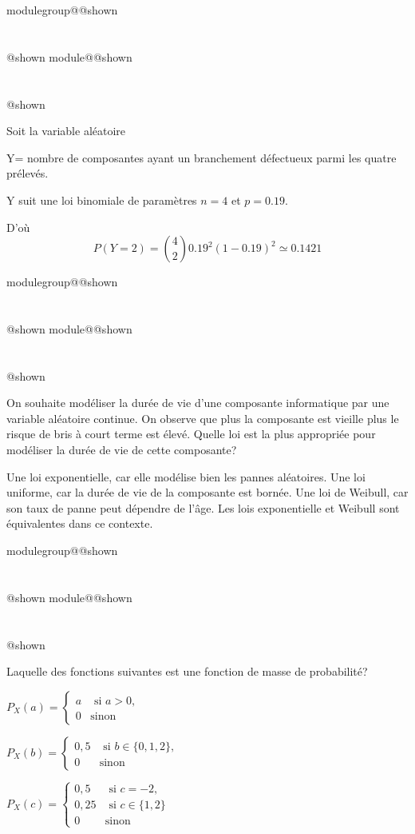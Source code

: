 \documentclass{Evaluation}
\makeatletter
\newcommand{\currentmodulekey}{}
\newcommand{\currentmoduletitle}{}
\newcommand{\currentgroupkey}{}
\newcommand{\currentgrouptitle}{}
\newcommand{\showmoduleifneeded}{%
  \ifx\currentgroupkey\empty\else
    \expandafter\ifx\csname modulegroup@\currentgroupkey @shown\endcsname\relax
      \section*{\currentgrouptitle}%
      \expandafter\gdef\csname modulegroup@\currentgroupkey @shown\endcsname{1}%
    \fi
  \fi
  \expandafter\ifx\csname module@\currentmodulekey @shown\endcsname\relax
    \section*{\currentmoduletitle}%
    \expandafter\gdef\csname module@\currentmodulekey @shown\endcsname{1}%
  \fi
}
\newenvironment{A22}{\showmoduleifneeded}{}
\newenvironment{A24}{\showmoduleifneeded}{}
\newenvironment{H26}{\showmoduleifneeded}{}
\makeatother
\begin{document}
\begin{questions}
\begin{A24}
\begin{center}
\begin{parts}
 \begin{solution}
     Soit la variable aléatoire 

     Y= nombre de composantes ayant un branchement défectueux parmi les quatre prélevés.

     Y suit une loi binomiale de paramètres $n=4$ et $p=0.19$.

     D'où
     $$P(Y=2) = \binom{4}{2}0.19^2(1-0.19)^2 \simeq 0.1421$$
 \end{solution}
\end{parts}
\end{center}
\end{A24}

\begin{H26}
\question {} %
On souhaite modéliser la durée de vie d’une composante informatique par une variable aléatoire continue. On observe que plus la composante est vieille plus le risque de bris à court terme est élevé. Quelle loi est la plus appropriée pour modéliser la durée de vie de cette composante?

\begin{checkboxes}
\choice Une loi exponentielle, car elle modélise bien les pannes aléatoires.
\choice Une loi uniforme, car la durée de vie de la composante est bornée.
\correctchoice Une loi de Weibull, car son taux de panne peut dépendre de l’âge.
\choice Les lois exponentielle et Weibull sont équivalentes dans ce contexte.
\end{checkboxes}
\end{H26}

\begin{A22}
\question {} %
Laquelle des fonctions suivantes est une fonction de masse de probabilité? 

\begin{checkboxes}
\choice $P_X(a)=\left\{
\begin{array}{ll}
a  & \mbox{ si } a>0, \\
0 & \mbox{sinon}
\end{array}
\right.$

\choice $ \displaystyle P_X(b)= \left\{
\begin{array}{ll}
0,5 &\mbox{ si } b \in \{0,1,2\}, \\
0 & \mbox{sinon}
\end{array}
\right.$

\CorrectChoice $ \displaystyle P_X(c)= \left\{
\begin{array}{ll}
0,5  & \mbox{ si } c=-2, \\
0,25 & \mbox{ si } c \in \{1, 2\} \\
0 & \mbox{sinon}
\end{array}
\right. $


\end{checkboxes}
\end{A22}
\end{questions}
\end{document}

